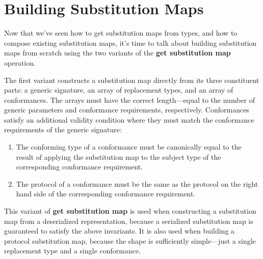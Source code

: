 \documentclass[../generics]{subfiles}
\begin{document}
\section{Building Substitution Maps}\label{buildingsubmaps}

Now that we've seen how to get substitution maps from types, and how to compose existing substitution maps, it's time to talk about building substitution maps from scratch using the two variants of the \textbf{get substitution map} operation.

\newcommand{\InvalidSubjectTypeSubMap}{\SubstMapLongC{
\SubstType{T}{Array<Int>}
}{
\SubstConf{T}{Array<Int>}{Sequence}\\
\SubstConf{T.[Sequence]Element}{String}{Comparable}
}}
The first variant constructs a substitution map directly from its three constituent parts: a generic signature, an array of replacement types, and an array of conformances. The arrays must have the correct length---equal to the number of generic parameters and conformance requirements, respectively. Conformances satisfy an additional validity condition where they must match the conformance requirements of the generic signature:
\begin{enumerate}
\item The conforming type of a conformance must be canonically equal to the result of applying the substitution map to the subject type of the corresponding conformance requirement.
\item The protocol of a conformance must be the same as the protocol on the right hand side of the corresponding conformance requirement.
\end{enumerate}
This variant of \textbf{get substitution map} is used when constructing a substitution map from a deserialized representation, because a serialized substitution map is guaranteed to satisfy the above invariants. It is also used when building a protocol substitution map, because the shape is sufficiently simple---just a single replacement type and a single conformance.
\end{document}
